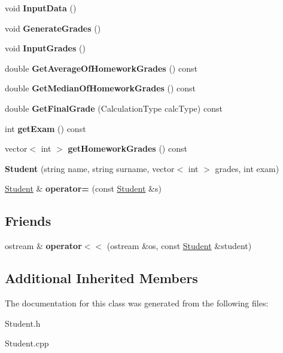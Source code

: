 \begin{DoxyCompactItemize}
\item 
\mbox{\label{class_student_adeba38b5e00b3ad4597e06ccfd46acae}} 
void {\bfseries Input\+Data} ()
\item 
\mbox{\label{class_student_ae60e33426b6882f6fbbbd2652398df58}} 
void {\bfseries Generate\+Grades} ()
\item 
\mbox{\label{class_student_ae40547d72944e19ea272521dbcaec486}} 
void {\bfseries Input\+Grades} ()
\item 
\mbox{\label{class_student_a2f8736a9774edfa3dd2a0da3f3352b86}} 
double {\bfseries Get\+Average\+Of\+Homework\+Grades} () const
\item 
\mbox{\label{class_student_a108bde6a8ee56e081e66455a01439452}} 
double {\bfseries Get\+Median\+Of\+Homework\+Grades} () const
\item 
\mbox{\label{class_student_af90f34843325716e051df654c89caced}} 
double {\bfseries Get\+Final\+Grade} (Calculation\+Type calc\+Type) const
\item 
\mbox{\label{class_student_a9f22f9beb6dfec1d0f2062636180768a}} 
int {\bfseries get\+Exam} () const
\item 
\mbox{\label{class_student_a49d87f2cd9212c47bc109da909de7f52}} 
vector$<$ int $>$ {\bfseries get\+Homework\+Grades} () const
\item 
\mbox{\label{class_student_a70282751963885ceb02a671e0d145c6d}} 
{\bfseries Student} (string name, string surname, vector$<$ int $>$ grades, int exam)
\item 
\mbox{\label{class_student_a44fc89318b56048cdb0f64d6c1642d94}} 
\mbox{\hyperlink{class_student}{Student}} \& {\bfseries operator=} (const \mbox{\hyperlink{class_student}{Student}} \&s)
\end{DoxyCompactItemize}
\subsection*{Friends}
\begin{DoxyCompactItemize}
\item 
\mbox{\label{class_student_ab2261232b8a279d496d17ecdb9596452}} 
ostream \& {\bfseries operator$<$$<$} (ostream \&os, const \mbox{\hyperlink{class_student}{Student}} \&student)
\end{DoxyCompactItemize}
\subsection*{Additional Inherited Members}


The documentation for this class was generated from the following files\+:\begin{DoxyCompactItemize}
\item 
Student.\+h\item 
Student.\+cpp\end{DoxyCompactItemize}
